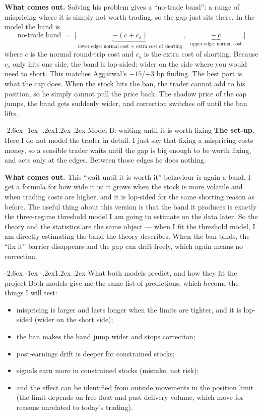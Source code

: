 \documentclass[11pt]{article}
\makeatletter
\renewcommand\subsection{\@startsection{subsection}{2}{\z@}%
  {-2.6ex \@plus -1ex \@minus -.2ex}{1.2ex \@plus.2ex}%
  {\normalfont\normalsize\bfseries\color{owblue}}}
\makeatother
\begin{document}
\textbf{What comes out.} Solving his problem gives a ``no-trade band'': a range of mispricing where it is simply not worth trading, so the gap just sits there. In the model the band is
\[
\boxed{\;\text{no-trade band} \;=\; \Big[\ \underbrace{-(c+c_s)}_{\text{lower edge: normal cost }+\text{ extra cost of shorting}}\ ,\ \ \underbrace{+\,c}_{\text{upper edge: normal cost}}\ \Big]\;}
\]
where $c$ is the normal round-trip cost and $c_s$ is the extra cost of shorting. Because $c_s$ only hits one side, the band is lop-sided: wider on the side where you would need to short. This matches Aggarwal's $-15$/$+3$ bp finding. The best part is what the cap does. When the stock hits the ban, the trader cannot add to his position, so he simply cannot pull the price back. The shadow price of the cap jumps, the band gets suddenly wider, and correction switches off until the ban lifts.

\subsection{Model B: waiting until it is worth fixing}
\textbf{The set-up.} Here I do not model the trader in detail. I just say that fixing a mispricing costs money, so a sensible trader waits until the gap is big enough to be worth fixing, and acts only at the edges. Between those edges he does nothing.

\textbf{What comes out.} This ``wait until it is worth it'' behaviour is again a band. I get a formula for how wide it is: it grows when the stock is more volatile and when trading costs are higher, and it is lop-sided for the same shorting reason as before. The useful thing about this version is that the band it produces is exactly the three-regime threshold model I am going to estimate on the data later. So the theory and the statistics are the same object --- when I fit the threshold model, I am directly estimating the band the theory describes. When the ban binds, the ``fix it'' barrier disappears and the gap can drift freely, which again means no correction.

\subsection{What both models predict, and how they fit the project}
Both models give me the same list of predictions, which become the things I will test:
\begin{itemize}
\item mispricing is larger and lasts longer when the limits are tighter, and it is lop-sided (wider on the short side);
\item the ban makes the band jump wider and stops correction;
\item post-earnings drift is deeper for constrained stocks;
\item signals earn more in constrained stocks (mistake, not risk);
\item and the effect can be identified from outside movements in the position limit (the limit depends on free float and past delivery volume, which move for reasons unrelated to today's trading).
\end{itemize}
\end{document}
